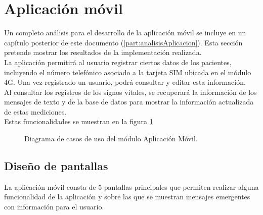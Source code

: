 \section{Aplicación móvil}

Un completo análisis para el desarrollo de la aplicación móvil se incluye en un capítulo posterior de este documento (\ref{part:analisisAplicacion}). Esta sección pretende mostrar los resultados de la implementación realizada. \\

La aplicación permitirá al usuario registrar ciertos datos de los pacientes, incluyendo el número telefónico asociado a la tarjeta SIM ubicada en el módulo 4G. Una vez registrado un usuario, podrá consultar y editar esta información. \\

Al consultar los registros de los signos vitales, se recuperará la información de los mensajes de texto y de la base de datos para mostrar la información actualizada de estas mediciones. \\

Estas funcionalidades se muestran en la figura \ref{fig:casosUso:AplicacionResumen}

\begin{figure}[htpb!]
	\begin{center}
		\caption{Diagrama de casos de uso del módulo Aplicación Móvil. \label{fig:casosUso:AplicacionResumen}}
	\end{center}
\end{figure}

\subsection{Diseño de pantallas}

La aplicación móvil consta de 5 pantallas principales que permiten realizar alguna funcionalidad de la aplicación y sobre las que se muestran mensajes emergentes con información para el usuario. \\



